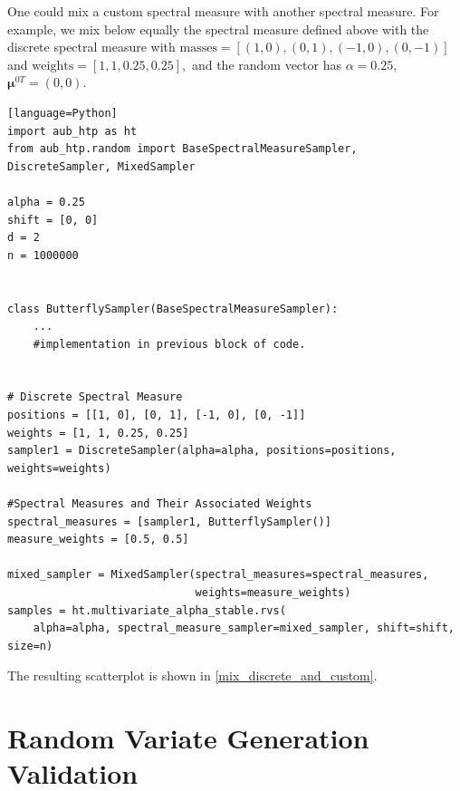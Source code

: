 
One could mix a custom spectral measure with another spectral measure. For example, we mix below equally the spectral measure defined above with the discrete spectral measure with $\text{masses}=[(1,0),(0,1),(-1,0),(0,-1)]$ and $ \text{weights}=[1,1,0.25,0.25],$ and the random vector has $\alpha=0.25$, $\boldsymbol{\mu}^{0 T}=(0,0)$.

\begin{verbatim}[language=Python]
import aub_htp as ht
from aub_htp.random import BaseSpectralMeasureSampler, DiscreteSampler, MixedSampler

alpha = 0.25
shift = [0, 0]
d = 2
n = 1000000


class ButterflySampler(BaseSpectralMeasureSampler):
    ...
    #implementation in previous block of code.


# Discrete Spectral Measure
positions = [[1, 0], [0, 1], [-1, 0], [0, -1]]
weights = [1, 1, 0.25, 0.25]
sampler1 = DiscreteSampler(alpha=alpha, positions=positions, weights=weights)

#Spectral Measures and Their Associated Weights
spectral_measures = [sampler1, ButterflySampler()]
measure_weights = [0.5, 0.5]

mixed_sampler = MixedSampler(spectral_measures=spectral_measures,
                             weights=measure_weights)
samples = ht.multivariate_alpha_stable.rvs(
    alpha=alpha, spectral_measure_sampler=mixed_sampler, shift=shift, size=n)

\end{verbatim}

The resulting scatterplot is shown in \cref{mix_discrete_and_custom}.

\section{Random Variate Generation Validation}

